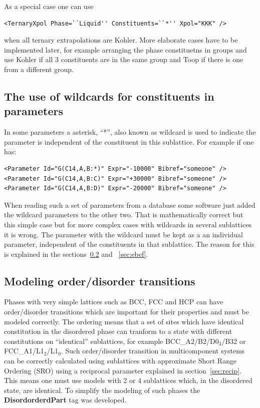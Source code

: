 \documentclass{article}
\begin{document}
\begin{appendices}
As a special case one can use

\begin{verbatim}
<TernaryXpol Phase=``Liquid'' Constituents=``*'' Xpol="KKK" />
\end{verbatim}
\noindent
when all ternary extrapolations are Kohler.  More elaborate cases have
to be implemented later, for example arranging the phase constituetns
in groups and use Kohler if all 3 constituents are in the same group
and Toop if there is one from a different group.

\subsection{The use of wildcards for constituents in parameters}\label{sec:wildcard}

In some parameters a asterisk, ``*'', also known as wildcard is used
to indicate the parameter is independent of the constituent in this
sublattice.  For example if one has:

\begin{verbatim}
<Parameter Id="G(C14,A,B:*)" Expr="-10000" Bibref="someone" />
<Parameter Id="G(C14,A,B:C)" Expr="+30000" Bibref="someone" />
<Parameter Id="G(C14,A,B:D)" Expr="-20000" Bibref="someone" />
\end{verbatim}

When reading such a set of parameters from a database some software
just added the wildcard parameters to the other two.  That is
mathematically correct but this simple case but for more complex cases
with wildcards in several sublattices it is wrong.  The parameter with
the wildcard must be kept as a an individual parameter, independent of
the constituents in that sublattice.  The reason for this is explained
in the sections~\ref{sec:OD} and ~\ref{sec:ebef}.

\subsection{Modeling order/disorder transitions}\label{sec:OD}

Phases with very simple lattices such as BCC, FCC and HCP can have
order/disorder transitions which are important for their properties
and must be modeled correctly.  The ordering means that a set of sites
which have identical constitution in the disordered phase can tranform
to a state with different constitutions on ``identical'' sublattices,
for example BCC\_A2/B2/D0$_3$/B32 or FCC\_A1/L1$_2$/L1$_0$.  Such
order/disorder transition in multicomponent systems can be correctly
calculated using sublattices with approximate Short Range Ordering
(SRO) using a reciprocal parameter explained in
section~\ref{sec:recip}.  This means one must use models with 2 or 4
sublattices which, in the disordered state, are identical.  To
simplify the modeling of such phases the {\bf DisordorderdPart} tag
was developed.


\end{appendices}
\end{document}
